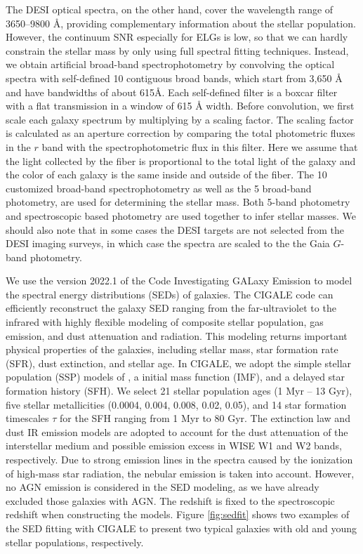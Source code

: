 \documentclass[twocolumn]{aastex631}
\newcommand{\boldtext}[1]{\textcolor[rgb]{0,0,0}{#1}}
\begin{document}
The DESI optical spectra, on the other hand, cover the wavelength range of 3650--9800 \AA, providing complementary information about the stellar population. However, the continuum SNR especially for ELGs is low, so that we can hardly constrain the stellar mass by only using full spectral fitting techniques. Instead, we obtain artificial broad-band spectrophotometry by convolving the optical spectra with self-defined 10 contiguous broad bands, which start from 3,650 {\AA} and have bandwidths of about 615{\AA}. Each self-defined filter is a boxcar filter with a flat transmission in a window of 615 {\AA} width. Before convolution, we first scale each galaxy spectrum by multiplying by a scaling factor. The scaling factor is calculated as an aperture correction by comparing the total photometric fluxes in the $r$ band with the spectrophotometric flux in this filter. \boldtext{Here we assume that the light collected by the fiber is proportional to the total light of the galaxy and the color of each galaxy is the same inside and outside of the fiber.} The 10 customized broad-band spectrophotometry as well as the 5 broad-band photometry, are used for determining the stellar mass. \boldtext{Both 5-band photometry and spectroscopic based photometry are used together to infer stellar masses.} We should also note that in some cases the DESI targets are not selected from the DESI imaging surveys, in which case the spectra are scaled to the the Gaia $G$-band photometry. 

We use the version 2022.1 of the Code Investigating GALaxy Emission \citep[CIGALE;][]{Boq19,Yan20,Yan22} to model the spectral energy distributions (SEDs) of galaxies. The CIGALE code can efficiently reconstruct the galaxy SED ranging from the far-ultraviolet to the infrared with highly flexible modeling of composite stellar population, gas emission, and dust attenuation and radiation. This modeling returns important physical properties of the galaxies, including stellar mass, star formation rate (SFR), dust extinction, and stellar age. In CIGALE, we adopt the  simple stellar population (SSP) models of \citet{Bru03}, a \citet{Cha03} initial mass function (IMF), and a delayed star formation history (SFH). We select 21 stellar population ages (1 Myr -- 13 Gyr), five stellar metallicities (0.0004, 0.004, 0.008, 0.02, 0.05), and 14 star formation timescales $\tau$ for the SFH ranging from 1 Myr to 80 Gyr.  The \citet{Cha00} extinction law and \citet{Dra14} dust IR emission models are adopted to account for the dust attenuation of the interstellar medium and possible emission excess in WISE W1 and W2 bands, respectively. Due to strong emission lines in the spectra caused by the ionization of high-mass star radiation, the nebular emission is taken into account. However, no AGN emission is considered in the SED modeling, as we have already excluded those galaxies with AGN. The redshift is fixed to the spectroscopic redshift when constructing the models. Figure \ref{fig:sedfit} shows two examples of the SED fitting with CIGALE to present two typical galaxies with old and young stellar populations, respectively.
\end{document}
